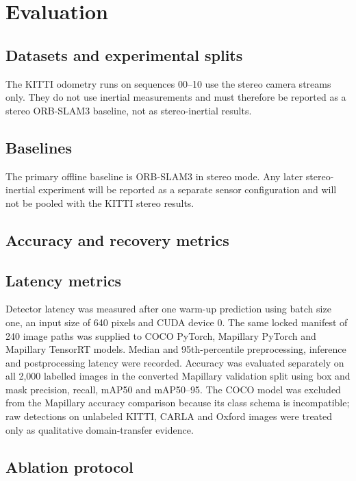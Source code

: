 \chapter{Evaluation}
\label{chap:evaluation}

\section{Datasets and experimental splits}

The KITTI odometry runs on sequences 00--10 use the stereo camera streams only.
They do not use inertial measurements and must therefore be reported as a
stereo ORB-SLAM3 baseline, not as stereo-inertial results.

\section{Baselines}

The primary offline baseline is ORB-SLAM3 in stereo mode. Any later
stereo-inertial experiment will be reported as a separate sensor configuration
and will not be pooled with the KITTI stereo results.

\section{Accuracy and recovery metrics}

\section{Latency metrics}

Detector latency was measured after one warm-up prediction using batch size
one, an input size of 640 pixels and CUDA device 0. The same locked manifest of
240 image paths was supplied to COCO PyTorch, Mapillary PyTorch and Mapillary
TensorRT models. Median and 95th-percentile preprocessing, inference and
postprocessing latency were recorded. Accuracy was evaluated separately on all
2,000 labelled images in the converted Mapillary validation split using box and
mask precision, recall, mAP50 and mAP50--95. The COCO model was excluded from
the Mapillary accuracy comparison because its class schema is incompatible;
raw detections on unlabeled KITTI, CARLA and Oxford images were treated only as
qualitative domain-transfer evidence.

\section{Ablation protocol}

